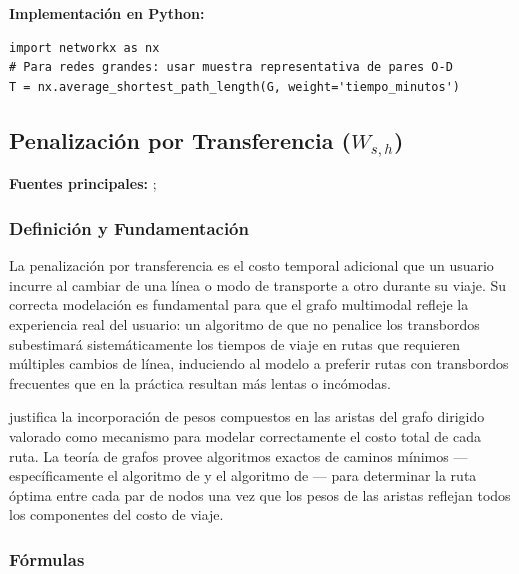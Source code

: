 \textbf{Implementación en Python:}

\begin{lstlisting}[style=estiloPython, caption={Cálculo del Tiempo de Viaje Promedio $T$ con NetworkX.}, label={lst:tiempo}]
import networkx as nx
# Para redes grandes: usar muestra representativa de pares O-D
T = nx.average_shortest_path_length(G, weight='tiempo_minutos')
\end{lstlisting}


\subsection{Penalización por Transferencia \texorpdfstring{($W_{s,h}$)}{(Ws,h)}}
\label{subsec:penalizacion-transferencia}

\textbf{Fuentes principales:} \textcite{allauca2023}; \textcite{aldous2019optimal}

\subsubsection{Definición y Fundamentación}

La penalización por transferencia es el costo temporal adicional \DIFaddbegin {}\DIFaddend que un usuario
incurre al cambiar de una línea o modo de transporte a otro durante su viaje. Su
correcta modelación es fundamental para que el grafo multimodal refleje la
experiencia real del usuario: un algoritmo de \dijkstra{} que no penalice los
transbordos subestimará sistemáticamente los tiempos de viaje en rutas que
requieren múltiples cambios de línea, induciendo al modelo a preferir rutas con
transbordos frecuentes que en la práctica resultan más lentas o incómodas.

\textcite{allauca2023} justifica la incorporación de pesos compuestos en las aristas
del grafo dirigido valorado como mecanismo para modelar correctamente el costo
total de cada ruta. La teoría de grafos provee algoritmos exactos de caminos
mínimos ---específicamente el algoritmo de \dijkstra{} y el algoritmo de
\floyd{}--- para determinar la ruta óptima entre cada par de nodos una vez que los
pesos de las aristas reflejan todos los componentes del costo de viaje.

\subsubsection{Fórmulas}

